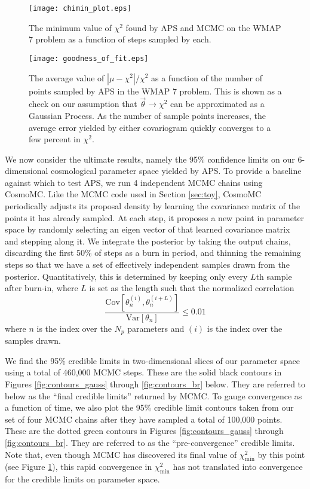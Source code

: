 \documentclass[useAMS,usenatbib]{aastex}
\begin{document}
\begin{figure}
\texttt{[image: chimin\_plot.eps]}
\caption{
The minimum value of $\chi^2$ found by APS and MCMC on the WMAP 7 problem
as a function of 
steps sampled by each.
}
\label{fig:chimin}
\end{figure}

\begin{figure}
\texttt{[image: goodness\_of\_fit.eps]}
\caption{
The average value of $|\mu-\chi^2|/\chi^2$ as a function of the number of points
sampled by APS in the WMAP 7 problem.  
This is shown as a check on our assumption that
$\vec{\theta}\rightarrow\chi^2$ can be approximated as a Gaussian Process.
As the number of sample points increases, the average error yielded by either
covariogram quickly converges to a few percent in $\chi^2$.
}
\label{fig:goodness}
\end{figure}

We now consider the ultimate results, namely the 95\% confidence limits on
our 6-dimensional cosmological parameter space yielded by APS.
To provide a baseline against which to test APS, we run 4 independent MCMC
chains using CosmoMC.  Like the MCMC code used in Section \ref{sec:toy},
CosmoMC periodically adjusts its proposal density by learning the covariance
matrix of the points it has already sampled.  At each step, it proposes
a new point in parameter space by randomly selecting an eigen vector
of that learned covariance matrix and stepping along it.
We integrate the posterior by taking the output chains, discarding the first
50\% of steps as a burn in period, and thinning the remaining steps so that
we have a set of effectively independent samples drawn from the posterior.
Quantitatively, this is determined by keeping only every $L$th sample after
burn-in, where $L$ is set as the length such that the normalized correlation
\begin{equation}
\frac{\text{Cov}[\theta_n^{(i)},\theta_n^{(i+L)}]}
{\text{Var}[\theta_n]}\le 0.01
\end{equation}
where $n$ is the index over the $N_p$ parameters and $(i)$ is the index
over the samples drawn.

We find the 95\% credible
limits in two-dimensional slices of our parameter space using
a total of 460,000 MCMC steps.  These are the solid
black contours in Figures \ref{fig:contours_gauss} through 
\ref{fig:contours_br} 
below.  They are referred to below as the ``final credible limits''
returned by MCMC.  To gauge
convergence as a function of time, we also plot the 95\% credible limit contours
taken from our set of four MCMC chains after they have sampled
a total of 100,000 points.  
These are the dotted green
contours in Figures \ref{fig:contours_gauss} through \ref{fig:contours_br}.
They are referred to as the ``pre-convergence'' credible limits.
Note that, even though MCMC has discovered its final value of $\chi^2_\text{min}$
by this point (see Figure \ref{fig:chimin}), this rapid convergence in
$\chi^2_\text{min}$ has not translated into convergence for the credible limits
on parameter space.
\end{document}
